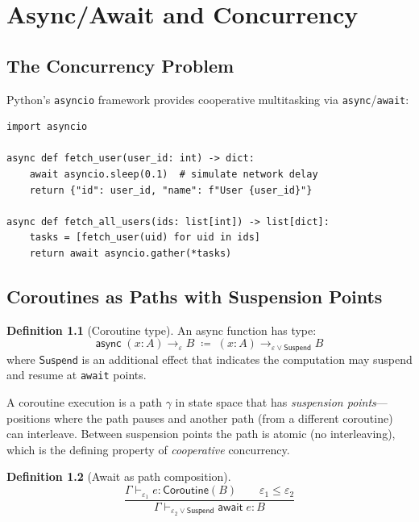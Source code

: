 \documentclass[11pt,a4paper]{report}
\theoremstyle{definition}
\newtheorem{definition}{Definition}[chapter]
\theoremstyle{plain}
\newcommand{\defeq}{\coloneqq}
\begin{document}
\chapter{Async/Await and Concurrency}
\label{ch:async}

\section{The Concurrency Problem}

Python's \texttt{asyncio} framework provides cooperative multitasking via
\texttt{async}/\texttt{await}:

\begin{lstlisting}[style=python]
import asyncio

async def fetch_user(user_id: int) -> dict:
    await asyncio.sleep(0.1)  # simulate network delay
    return {"id": user_id, "name": f"User {user_id}"}

async def fetch_all_users(ids: list[int]) -> list[dict]:
    tasks = [fetch_user(uid) for uid in ids]
    return await asyncio.gather(*tasks)
\end{lstlisting}

\section{Coroutines as Paths with Suspension Points}

\begin{definition}[Coroutine type]
An async function has type:
\[
  \mathsf{async}\;(x : A) \to_\varepsilon B \;\defeq\; (x : A) \to_{\varepsilon \vee \mathsf{Suspend}} B
\]
where $\mathsf{Suspend}$ is an additional effect that indicates the computation
may suspend and resume at \texttt{await} points.
\end{definition}

A coroutine execution is a path $\gamma$ in state space that has
\emph{suspension points}---positions where the path pauses and another path
(from a different coroutine) can interleave.  Between suspension points the
path is atomic (no interleaving), which is the defining property of
\emph{cooperative} concurrency.

\begin{definition}[Await as path composition]
\[
  \frac{
    \Gamma \vdash_{\varepsilon_1} e : \mathsf{Coroutine}(B) \qquad
    \varepsilon_1 \leq \varepsilon_2
  }{
    \Gamma \vdash_{\varepsilon_2 \vee \mathsf{Suspend}} \mathsf{await}\;e : B
  }
\]
\end{definition}
\end{document}
